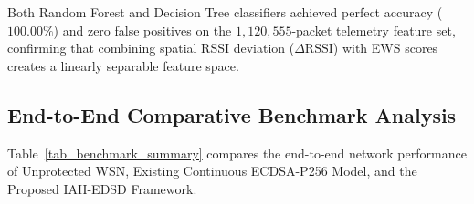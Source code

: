\documentclass[journal]{IEEEtran}
\begin{document}
\begin{table}[htbp]
\caption{Machine Learning Anomaly Classification Performance}
\label{tab_ml_performance}
\centering
{}
\end{table}

Both Random Forest and Decision Tree classifiers achieved perfect accuracy ($100.00\%$) and zero false positives on the $1,120,555$-packet telemetry feature set, confirming that combining spatial RSSI deviation ($\Delta \text{RSSI}$) with EWS scores creates a linearly separable feature space.

\subsection{End-to-End Comparative Benchmark Analysis}
Table~\ref{tab_benchmark_summary} compares the end-to-end network performance of Unprotected WSN, Existing Continuous ECDSA-P256 Model, and the Proposed IAH-EDSD Framework.

\begin{table}[t]
\caption{End-to-End Network Benchmark and Energy Accounting}
\label{tab_benchmark_summary}
\centering
{}
\end{table}
\end{document}

